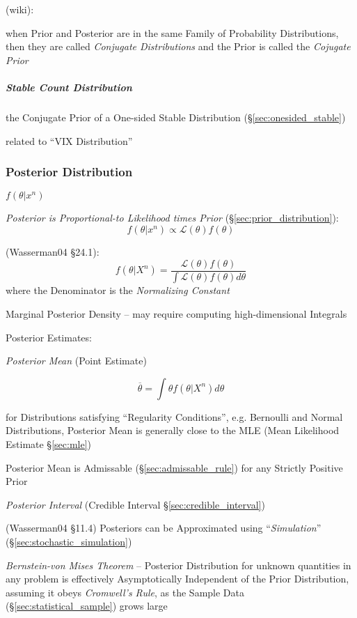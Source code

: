 (wiki):

when Prior and Posterior are in the same Family of Probability Distributions,
then they are called \emph{Conjugate Distributions} and the Prior is called the
\emph{Cojugate Prior}



\subparagraph{Stable Count Distribution}\label{sec:stable_count}\hfill

the Conjugate Prior of a One-sided Stable Distribution
(\S\ref{sec:onesided_stable})

related to ``VIX Distribution''



\subsubsection{Posterior Distribution}\label{sec:posterior_distribution}

$f(\theta | x^n)$

\emph{Posterior is Proportional-to Likelihood times Prior}
(\S\ref{sec:prior_distribution}):
\[
  f(\theta | x^n) \propto \mathcal{L}(\theta)f(\theta)
\]

(Wasserman04 \S24.1):
\[
  f(\theta | X^n) = \frac{
    \mathcal{L}(\theta) f(\theta)
  }{
    \int \mathcal{L}(\theta) f(\theta) d\theta
  }
\]
where the Denominator is the \emph{Normalizing Constant}

Marginal Posterior Density -- may require computing high-dimensional Integrals

Posterior Estimates:

\emph{Posterior Mean} (Point Estimate)

\[
  \overline{\theta} = \int \theta f(\theta | X^n) d\theta
\]

for Distributions satisfying ``Regularity Conditions'', e.g. Bernoulli and
Normal Distributions, Posterior Mean is generally close to the MLE (Mean
Likelihood Estimate \S\ref{sec:mle})

Posterior Mean is Admissable (\S\ref{sec:admissable_rule}) for any Strictly
Positive Prior

\emph{Posterior Interval} (Credible Interval \S\ref{sec:credible_interval})

(Wasserman04 \S11.4) Posteriors can be Approximated using ``\emph{Simulation}''
(\S\ref{sec:stochastic_simulation})

\emph{Bernstein-von Mises Theorem} -- Posterior Distribution for unknown
quantities in any problem is effectively Asymptotically Independent of the Prior
Distribution, assuming it obeys \emph{Cromwell's Rule}, as the Sample Data
(\S\ref{sec:statistical_sample}) grows large



